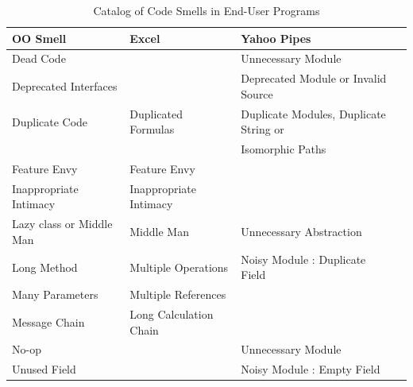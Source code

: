 \documentclass{sig-alternate}
\renewcommand*\cmidrule{\midrule[0.001em]} %
\begin{document}
\begin{table}
\caption{Catalog of Code Smells in End-User Programs
\label{table:oosmellslarge}}
\centering
\sffamily
\begin{tabular} {@{}llll@{}}
\toprule
\textbf{OO Smell}
	& \textbf{Excel}
	& \textbf{Yahoo Pipes}
\\ \midrule
Dead Code
	& %
	& Unnecessary Module \cite{StoleeTSE2013}
\\ \cmidrule
Deprecated Interfaces
	& %
	& Deprecated Module or Invalid Source \cite{StoleeTSE2013}

\\ \cmidrule
Duplicate Code
	& Duplicated Formulas \cite{Hermans2012intra}
	& Duplicate Modules, Duplicate String or
\\ %
& 
& Isomorphic Paths \cite{StoleeTSE2013}
\\ \cmidrule
Feature Envy
	& Feature Envy \cite{Hermans2012inter}
	& %
\\ \cmidrule
Inappropriate Intimacy
	& Inappropriate Intimacy \cite{Hermans2012inter}
	& %
\\ \cmidrule
Lazy class or Middle Man
	& Middle Man \cite{Hermans2012inter}
	& Unnecessary Abstraction \cite{StoleeTSE2013}
\\ \cmidrule
Long Method
	& Multiple Operations \cite{Hermans2012intra}
	& Noisy Module : Duplicate Field \cite{StoleeTSE2013}
\\ \cmidrule
Many Parameters
	& Multiple References \cite{Hermans2012intra}
	& 
\\ \cmidrule
Message Chain
	& Long Calculation Chain \cite{Hermans2012intra}
	& 
\\ \cmidrule
No-op
	& %
	& Unnecessary Module \cite{StoleeTSE2013}
\\ \cmidrule
Unused Field
	& %
	& Noisy Module : Empty Field \cite{StoleeTSE2013}
\\ \bottomrule
\end{tabular}
\end{table}
\end{document}
